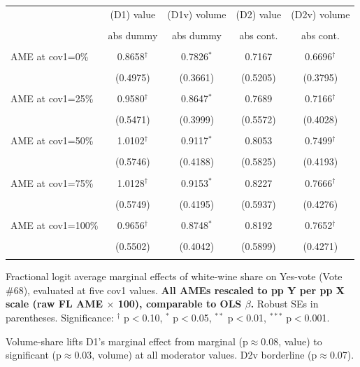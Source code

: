\begin{threeparttable}
\begin{tabular}{lcccc}
\toprule
 & (D1) value & (D1v) volume & (D2) value & (D2v) volume \\\\
 & abs dummy & abs dummy & abs cont. & abs cont. \\\\
\midrule
AME at cov1=0\% & 0.8658$^{\dagger}$ & 0.7826$^{*}$ & 0.7167 & 0.6696$^{\dagger}$ \\\\
  & (0.4975) & (0.3661) & (0.5205) & (0.3795) \\\\
AME at cov1=25\% & 0.9580$^{\dagger}$ & 0.8647$^{*}$ & 0.7689 & 0.7166$^{\dagger}$ \\\\
  & (0.5471) & (0.3999) & (0.5572) & (0.4028) \\\\
AME at cov1=50\% & 1.0102$^{\dagger}$ & 0.9117$^{*}$ & 0.8053 & 0.7499$^{\dagger}$ \\\\
  & (0.5746) & (0.4188) & (0.5825) & (0.4193) \\\\
AME at cov1=75\% & 1.0128$^{\dagger}$ & 0.9153$^{*}$ & 0.8227 & 0.7666$^{\dagger}$ \\\\
  & (0.5749) & (0.4195) & (0.5937) & (0.4276) \\\\
AME at cov1=100\% & 0.9656$^{\dagger}$ & 0.8748$^{*}$ & 0.8192 & 0.7652$^{\dagger}$ \\\\
  & (0.5502) & (0.4042) & (0.5899) & (0.4271) \\\\
\bottomrule
\end{tabular}
\begin{tablenotes}[flushleft]\footnotesize
\item Fractional logit average marginal effects of white-wine share on Yes-vote (Vote \#68), evaluated at five cov1 values.  \textbf{All AMEs rescaled to pp Y per pp X scale (raw FL AME $\times$ 100), comparable to OLS $\beta$.}  Robust SEs in parentheses.  Significance: $^{\dagger}$ p$<$0.10, $^{*}$ p$<$0.05, $^{**}$ p$<$0.01, $^{***}$ p$<$0.001.
\item Volume-share lifts D1's marginal effect from marginal (p$\approx$0.08, value) to significant (p$\approx$0.03, volume) at all moderator values.  D2v borderline (p$\approx$0.07).
\end{tablenotes}
\end{threeparttable}
